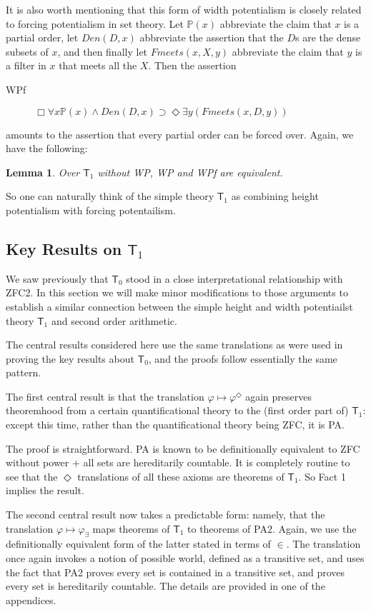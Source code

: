 \documentclass{article}
\newtheorem{lemma}{Lemma}
\begin{document}
It is also worth mentioning that this form of width potentialism is closely related 
to forcing potentialism in set theory. Let $\mathbb{P}(x)$ abbreviate the claim 
that $x$ is a partial order, let $Den(D, x)$ abbreviate the assertion that the $D$s 
are the dense subsets of $x$, and then finally let $Fmeets(x, X, y)$ abbreviate the 
claim that $y$ is a filter in $x$ that meets all the $X$. Then the assertion
\begin{description}
    \item[WPf] $\Box \forall x \mathbb{P}(x) \wedge Den(D, x) \supset \Diamond \exists y (Fmeets(x, D, y))$
\end{description}
amounts to the assertion that every partial order can be forced over. Again, we have 
the following:
\begin{lemma}
    Over $\mathsf{T}_1$ without WP, WP and WPf are equivalent.
\end{lemma}
So one can naturally think of the simple theory $\mathsf{T}_1$ as combining height 
potentialism with forcing potentailism. 

\subsection{Key Results on $\mathsf{T}_1$}
We saw previously that $\mathsf{T}_0$ stood in a close interpretational relationship 
with ZFC2. In this section we will make minor modifications to those arguments 
to establish a similar connection between the simple height and width potentiailst 
theory $\mathsf{T}_1$ and second order arithmetic.

The central results considered here use the same translations as were used in 
proving the key results about $\mathsf{T}_0$, and the proofs follow essentially the 
same pattern. 

The first central result is that the translation $\varphi \mapsto \varphi^\Diamond$ 
again preserves theoremhood from a certain quantificational theory 
to the (first order part of) $\mathsf{T}_1$: except this time, 
rather than the quantificational theory 
being ZFC, it is PA. 

The proof is straightforward. PA is known to be definitionally equivalent to 
ZFC without power + all sets are hereditarily countable. It is completely 
routine to see that the $\Diamond$ translations of all these axioms are theorems 
of $\mathsf{T}_1$. So Fact 1 implies the result. 

The second central result now takes a predictable form: namely, that the 
translation $\varphi \mapsto \varphi_\exists$ maps theorems of $\mathsf{T}_1$ 
to theorems of PA2. Again, we use the definitionally equivalent form of the latter 
stated in terms of $\in$. The translation once again invokes a notion of possible 
world, defined as a transitive set, and uses the fact that PA2 proves every set is 
contained in a transitive set, and proves every set is hereditarily countable. 
The details are provided in one of the appendices.
\end{document}
